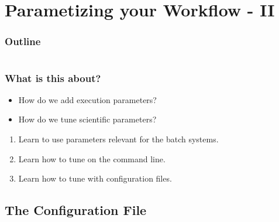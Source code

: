 \section{Parametizing your Workflow - II}

\begin{frame}
    \frametitle{Outline}
    \begin{columns}[t]
        \begin{column}{.5\textwidth}
            \tableofcontents[sections={1-7},currentsection]
        \end{column}
        \begin{column}{.5\textwidth}
            \tableofcontents[sections={8-15},currentsection]
        \end{column}
    \end{columns}
\end{frame}

\begin{frame}
  \frametitle{What is this about?}
  \begin{question}[Questions]
   	\begin{itemize}
      \item How do we add execution parameters?
      \item How do we tune scientific parameters?
    \end{itemize}
  \end{question}
   \begin{docs}[Objectives]
   	 \begin{enumerate} 
        \item Learn to use parameters relevant for the batch systems.
        \item Learn how to tune \Snakemake{} on the command line.
        \item Learn how to tune \Snakemake{} with configuration files.
    \end{enumerate}
  \end{docs}
\end{frame}

\subsection{The Configuration File}

